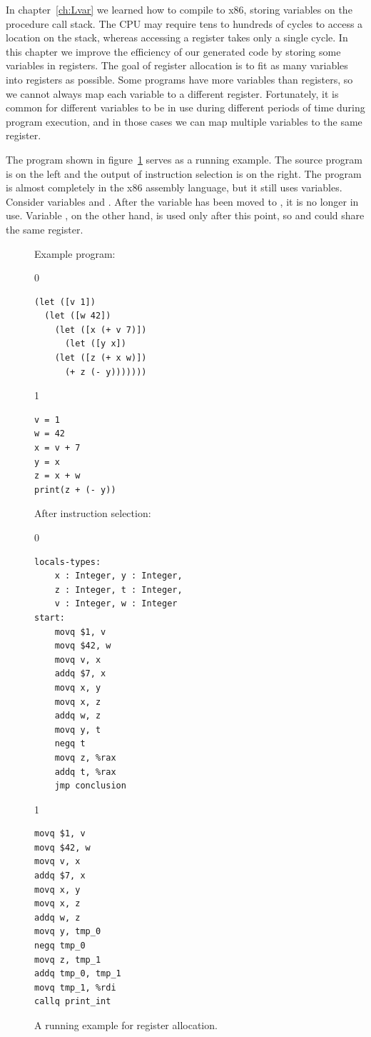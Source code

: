 \documentclass[7x10]{TimesAPriori_MIT}%
\def\racketEd{0}
\def\pythonEd{1}
\def\edition{1}
\newcommand{\pythonColor}[0]{}
\numberwithin{theorem}{chapter}
\numberwithin{definition}{chapter}
\numberwithin{equation}{chapter}
\begin{document}

In chapter~\ref{ch:Lvar} we learned how to compile \LangVar{} to x86,
storing variables on the procedure call stack.  The CPU may require tens
to hundreds of cycles to access a location on the stack, whereas
accessing a register takes only a single cycle. In this chapter we
improve the efficiency of our generated code by storing some variables
in registers. The goal of register allocation is to fit as many
variables into registers as possible. Some programs have more
variables than registers, so we cannot always map each variable to a
different register. Fortunately, it is common for different variables
to be in use during different periods of time during program
execution, and in those cases we can map multiple variables to the
same register.

The program shown in figure~\ref{fig:reg-eg} serves as a running
example. The source program is on the left and the output of
instruction selection
is on the right. The program is almost
completely in the x86 assembly language, but it still uses variables.
Consider variables  and .  After the variable 
has been moved to , it is no longer in use.  Variable , on
the other hand, is used only after this point, so  and
 could share the same register.

\begin{figure}
\begin{tcolorbox}[colback=white]
\begin{minipage}{0.45\textwidth}
Example \LangVar{} program:
{\if\edition\racketEd
\begin{lstlisting}
(let ([v 1])
  (let ([w 42])
    (let ([x (+ v 7)])
      (let ([y x])
	(let ([z (+ x w)])
	  (+ z (- y)))))))
\end{lstlisting}
\fi}
{\if\edition\pythonEd\pythonColor
\begin{lstlisting}
v = 1
w = 42
x = v + 7
y = x
z = x + w
print(z + (- y))
\end{lstlisting}
\fi}
\end{minipage}
\begin{minipage}{0.45\textwidth}
After instruction selection:
{\if\edition\racketEd
\begin{lstlisting}
locals-types:
    x : Integer, y : Integer,
    z : Integer, t : Integer,
    v : Integer, w : Integer
start:
    movq $1, v
    movq $42, w
    movq v, x
    addq $7, x
    movq x, y
    movq x, z
    addq w, z
    movq y, t
    negq t
    movq z, %rax
    addq t, %rax
    jmp conclusion
\end{lstlisting}
\fi}
{\if\edition\pythonEd\pythonColor
\begin{lstlisting}
movq $1, v
movq $42, w
movq v, x
addq $7, x
movq x, y
movq x, z
addq w, z
movq y, tmp_0
negq tmp_0
movq z, tmp_1
addq tmp_0, tmp_1
movq tmp_1, %rdi
callq print_int
\end{lstlisting}
\fi}
\end{minipage}
\end{tcolorbox}
\caption{A running example for register allocation.}
\label{fig:reg-eg}
\end{figure}
\end{document}
